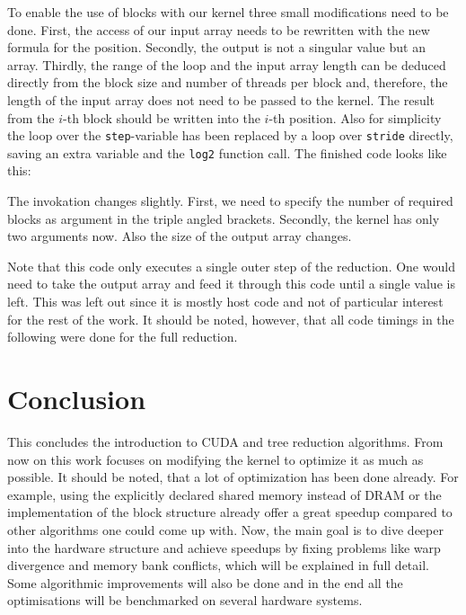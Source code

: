 To enable the use of blocks with our kernel three small modifications need to be done.
First, the access of our input array needs to be rewritten with the new formula for the position.
Secondly, the output is not a singular value but an array.
Thirdly, the range of the loop and the input array length can be deduced directly from the block size and number of threads per block and, therefore, the length of the input array does not need to be passed to the kernel.
The result from the \(i\)-th block should be written into the \(i\)-th position.
Also for simplicity the loop over the \texttt{step}-variable has been replaced by a loop over \texttt{stride} directly, saving an extra variable and the \texttt{log2} function call.
The finished code looks like this:



The invokation changes slightly.
First, we need to specify the number of required blocks as argument in the triple angled brackets.
Secondly, the kernel has only two arguments now.
Also the size of the output array changes.



Note that this code only executes a single outer step of the reduction.
One would need to take the output array and feed it through this code until a single value is left.
This was left out since it is mostly host code and not of particular interest for the rest of the work.
It should be noted, however, that all code timings in the following were done for the full reduction.

\section{Conclusion}
This concludes the introduction to CUDA and tree reduction algorithms.
From now on this work focuses on modifying the kernel to optimize it as much as possible.
It should be noted, that a lot of optimization has been done already.
For example, using the explicitly declared shared memory instead of DRAM or the implementation of the block structure already offer a great speedup compared to other algorithms one could come up with.
Now, the main goal is to dive deeper into the hardware structure and achieve speedups by fixing problems like warp divergence and memory bank conflicts, which will be explained in full detail.
Some algorithmic improvements will also be done and in the end all the optimisations will be benchmarked on several hardware systems.
